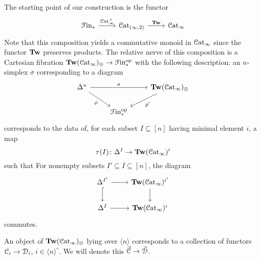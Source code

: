 \documentclass[main.tex]{subfiles}
\begin{document}
The starting point of our construction is the functor
\begin{equation*}
  \begin{tikzcd}
    \Finp
    \arrow[r, "\ICat^{\times}"]
    & \Cat_{(\infty, 2)}
    \arrow[r, "\Tw"]
    & \ICat
  \end{tikzcd}
\end{equation*}
Note that this composition yields a commutative monoid in $\mathcal{C}\mathrm{at}_{\infty}$ since the functor $\mathbf{Tw}$ preserves products. The relative nerve of this composition is a Cartesian fibration $\mathbf{Tw}(\mathcal{C}\mathrm{at}_{\infty})_{\otimes} \to \mathcal{F}\mathrm{in}_{*}^{\mathrm{op}}$ with the following description: an $n$-simplex $\sigma$ corresponding to a diagram
\begin{equation*}
  \begin{tikzcd}
    \Delta^{n}
    \arrow[rr, "\sigma"]
    \arrow[dr, swap, "\phi"]
    && \Tw(\ICat)_{\otimes}
    \arrow[dl, "p'"]
    \\
    & \Finp\op
  \end{tikzcd}
\end{equation*}
corresponds to the data of, for each subset $I \subseteq [n]$ having minimal element $i$, a map
\begin{equation*}
  \tau(I)\colon \Delta^{I} \to \mathbf{Tw}(\mathcal{C}\mathrm{at}_{\infty})^{i}
\end{equation*}
such that For nonempty subsets $I' \subseteq I \subseteq [n]$, the diagram
\begin{equation*}
  \begin{tikzcd}
    \Delta^{I'}
    \arrow[r]
    \arrow[d, hook]
    & \Tw(\ICat)^{i'}
    \arrow[d]
    \\
    \Delta^{I}
    \arrow[r]
    & \Tw(\ICat)^{i}
  \end{tikzcd}
\end{equation*}
commutes.

\begin{example}
  An object of $\mathbf{Tw}(\mathcal{C}\mathrm{at}_{\infty})_{\otimes}$ lying over $\langle n \rangle$ corresponds to a collection of functors $\mathcal{C}_{i} \to \mathcal{D}_{i}$, $i \in \langle n \rangle^{\circ}$. We will denote this $\vec{\mathcal{C}} \to \vec{\mathcal{D}}$.
\end{example}
\end{document}
